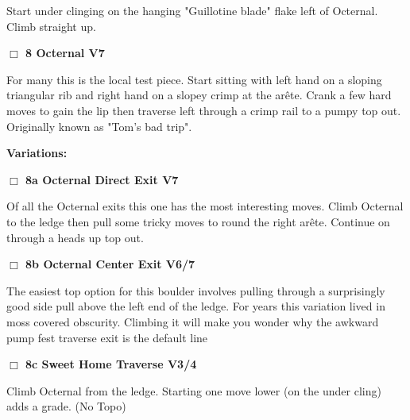 \begin{multicols}{2}
\begin{adjustwidth}{1.3em}{}
Start under clinging on the hanging "Guillotine blade" flake left of Octernal. Climb straight up.
\end{adjustwidth}




\needspace{2em}
\label{rt:Octernal}
\colorbox{Goldenrod!20}{
\parbox{0.95\linewidth}{
\hspace{-1ex}\textbf{$\Box$
8 Octernal V7  
}}}
\begin{adjustwidth}{1.3em}{}			

For many this is the local test piece. Start sitting with left hand on a sloping triangular rib and right hand on a slopey crimp at the arête. Crank a few hard moves to gain the lip then traverse left through a crimp rail to a pumpy top out. Originally known as "Tom's bad trip".
\end{adjustwidth}


\begin{adjustwidth}{0.5cm}{}				
\needspace{4em}
\textbf{Variations:} \newline

\needspace{2em}
\label{vr:Octernal Direct Exit}
\colorbox{Goldenrod!20}{
\parbox{0.95\linewidth}{
\hspace{-1ex}\textbf{$\Box$
8a Octernal Direct Exit V7  
}}}
\begin{adjustwidth}{1.3em}{}			

Of all the Octernal exits this one has the most interesting moves. Climb Octernal to the ledge then pull some tricky moves to round the right arête. Continue on through a heads up top out.
\end{adjustwidth}




\needspace{2em}
\label{vr:Octernal Center Exit}
\colorbox{Goldenrod!20}{
\parbox{0.95\linewidth}{
\hspace{-1ex}\textbf{$\Box$
8b Octernal Center Exit V6/7  
}}}
\begin{adjustwidth}{1.3em}{}			

The easiest top option for this boulder involves pulling through a surprisingly good side pull above the left end of the ledge. For years this variation lived in moss covered obscurity. Climbing it will make you wonder why the awkward pump fest traverse exit is the default line
\end{adjustwidth}




\needspace{2em}
\label{vr:Sweet Home Traverse}
\colorbox{RoyalBlue!20}{
\parbox{0.95\linewidth}{
\hspace{-1ex}\textbf{$\Box$
8c Sweet Home Traverse V3/4  
}}}
\begin{adjustwidth}{1.3em}{}			

Climb Octernal from the ledge. Starting one move lower (on the under cling) adds a grade.
  (No Topo)
\end{adjustwidth}



\end{adjustwidth}
	\end{multicols}
